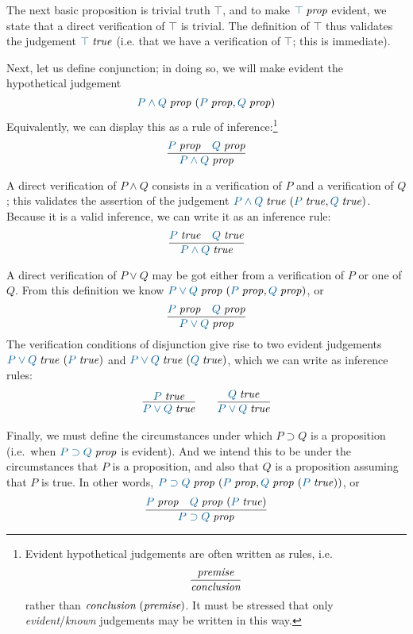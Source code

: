 The next basic proposition is trivial truth $\top$, and to make
$\isprop{\top}$ evident, we state that a direct verification of $\top$
is trivial. The definition of $\top$ thus validates the judgement
$\istrue{\top}$ (i.e. that we have a verification of $\top$; this
is immediate).

Next, let us define conjunction; in doing so, we will make evident the
hypothetical judgement
\[\hyp{\isprop{P\land Q}}{\isprop{P},\isprop{Q}}\]
Equivalently, we can display this as a rule of inference:\footnote{
Evident hypothetical judgements are often written as rules, i.e.
\[
  \infer{\textit{conclusion}}{\textit{premise}}
\]
rather than $\textit{conclusion}\ (\textit{premise})$. It must be
stressed that only \emph{evident}/\emph{known} judgements may be
written in this way.
}
\[
  \infer{
    \isprop{P\land Q}
  }{
    \isprop{P} &
    \isprop{Q}
  }
\]

A direct verification of $P\land Q$ consists in a verification of $P$
and a verification of $Q$; this validates the assertion of the judgement
$\hyp{\istrue{P\land Q}}{\istrue{P},\istrue{Q}}$. Because it is a valid
inference, we can write it as an inference rule:
\[
  \infer{
    \istrue{P\land Q}
  }{
    \istrue{P} &
    \istrue{Q}
  }
\]

A direct verification of $P\lor Q$ may be got either from a verification
of $P$ or one of $Q$. From this definition we know $\hyp{\isprop{P\lor
Q}}{\isprop{P},\isprop{Q}}$, or
\[
  \infer{
    \isprop{P\lor Q}
  }{
    \isprop{P} &
    \isprop{Q}
  }
\]
The verification conditions of disjunction give
rise to two evident judgements $\hyp{\istrue{P\lor Q}}{\istrue{P}}$ and
$\hyp{\istrue{P\lor Q}}{\istrue{Q}}$, which we can write as inference rules:
\begin{gather*}
  \infer{
    \istrue{P\lor Q}
  }{
    \istrue{P}
  }
  \qquad
  \infer{
    \istrue{P\lor Q}
  }{
    \istrue{Q}
  }
\end{gather*}

Finally, we must define the circumstances under which $P\supset Q$ is
a proposition (i.e.\ when $\isprop{P\supset Q}$ is evident). And we
intend this to be under the circumstances that $P$ is a proposition,
and also that $Q$ is a proposition assuming that $P$ is true. In other
words, $\hyp{\isprop{P\supset Q}}{\isprop{P},
\hyp{\isprop{Q}}{\istrue{P}}}$, or
\[
  \infer{
    \isprop{P\supset Q}
  }{
    \isprop{P} &
    \hyp{\isprop{Q}}{\istrue{P}}
  }
\]

